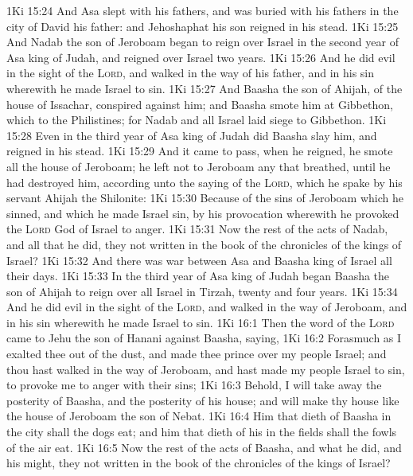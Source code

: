\vs 1Ki 15:24 And Asa slept with his fathers, and was buried with his fathers in the city of David his father: and Jehoshaphat his son reigned in his stead.
\vs 1Ki 15:25 And Nadab the son of Jeroboam began to reign over Israel in the second year of Asa king of Judah, and reigned over Israel two years.
\vs 1Ki 15:26 And he did evil in the sight of the \textsc{Lord}, and walked in the way of his father, and in his sin wherewith he made Israel to sin.
\vs 1Ki 15:27 And Baasha the son of Ahijah, of the house of Issachar, conspired against him; and Baasha smote him at Gibbethon, which  to the Philistines; for Nadab and all Israel laid siege to Gibbethon.
\vs 1Ki 15:28 Even in the third year of Asa king of Judah did Baasha slay him, and reigned in his stead.
\vs 1Ki 15:29 And it came to pass, when he reigned,  he smote all the house of Jeroboam; he left not to Jeroboam any that breathed, until he had destroyed him, according unto the saying of the \textsc{Lord}, which he spake by his servant Ahijah the Shilonite:
\vs 1Ki 15:30 Because of the sins of Jeroboam which he sinned, and which he made Israel sin, by his provocation wherewith he provoked the \textsc{Lord} God of Israel to anger.
\vs 1Ki 15:31 Now the rest of the acts of Nadab, and all that he did,  they not written in the book of the chronicles of the kings of Israel?
\vs 1Ki 15:32 And there was war between Asa and Baasha king of Israel all their days.
\vs 1Ki 15:33 In the third year of Asa king of Judah began Baasha the son of Ahijah to reign over all Israel in Tirzah, twenty and four years.
\vs 1Ki 15:34 And he did evil in the sight of the \textsc{Lord}, and walked in the way of Jeroboam, and in his sin wherewith he made Israel to sin.
\vs 1Ki 16:1 Then the word of the \textsc{Lord} came to Jehu the son of Hanani against Baasha, saying,
\vs 1Ki 16:2 Forasmuch as I exalted thee out of the dust, and made thee prince over my people Israel; and thou hast walked in the way of Jeroboam, and hast made my people Israel to sin, to provoke me to anger with their sins;
\vs 1Ki 16:3 Behold, I will take away the posterity of Baasha, and the posterity of his house; and will make thy house like the house of Jeroboam the son of Nebat.
\vs 1Ki 16:4 Him that dieth of Baasha in the city shall the dogs eat; and him that dieth of his in the fields shall the fowls of the air eat.
\vs 1Ki 16:5 Now the rest of the acts of Baasha, and what he did, and his might,  they not written in the book of the chronicles of the kings of Israel?
